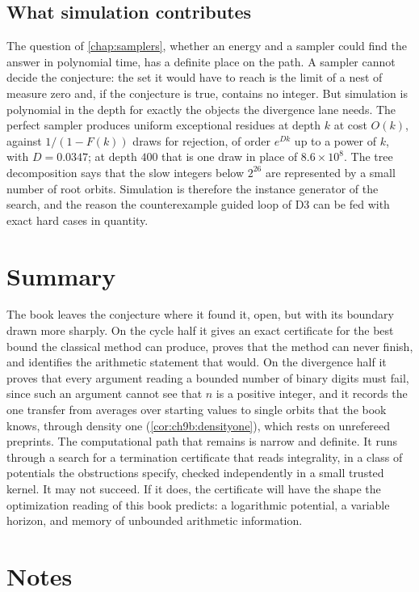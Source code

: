 \subsection{What simulation contributes}

The question of \cref{chap:samplers}, whether an energy and a sampler could
find the answer in polynomial time, has a definite place on the path. A
sampler cannot decide the conjecture: the set it would have to reach is the
limit of a nest of measure zero and, if the conjecture is true, contains no
integer. But simulation is polynomial in the depth for exactly the objects the
divergence lane needs. The perfect sampler produces uniform exceptional
residues at depth $k$ at cost $O(k)$, against $1/(1-F(k))$ draws for rejection, of order $e^{Dk}$ up to a power of $k$, with
$D=0.0347$; at depth $400$ that is one draw in place of $8.6\times10^8$. The tree
decomposition says that the slow integers below $2^{26}$ are represented by
a small number of root orbits. Simulation is therefore the instance generator
of the search, and the reason the counterexample guided loop of D3 can be fed
with exact hard cases in quantity.

\section{Summary}\label{sec:ch10d:summary}

The book leaves the conjecture where it found it, open, but with its boundary
drawn more sharply. On the cycle half it gives an exact certificate for the
best bound the classical method can produce, proves that the method can never
finish, and identifies the arithmetic statement that would. On the divergence
half it proves that every argument reading a bounded number of binary digits
must fail, since such an argument cannot see that $n$ is a positive integer, and it records the one transfer
from averages over starting values to single orbits that the book knows, through density one (\cref{cor:ch9b:densityone}), which rests on unrefereed preprints.
The computational path that remains is narrow and definite. It runs through a
search for a termination certificate that reads integrality, in a class of
potentials the obstructions specify, checked independently in a small trusted
kernel. It may not succeed. If it does, the certificate will have the shape the
optimization reading of this book predicts: a logarithmic potential, a
variable horizon, and memory of unbounded arithmetic information.

\section*{Notes}

